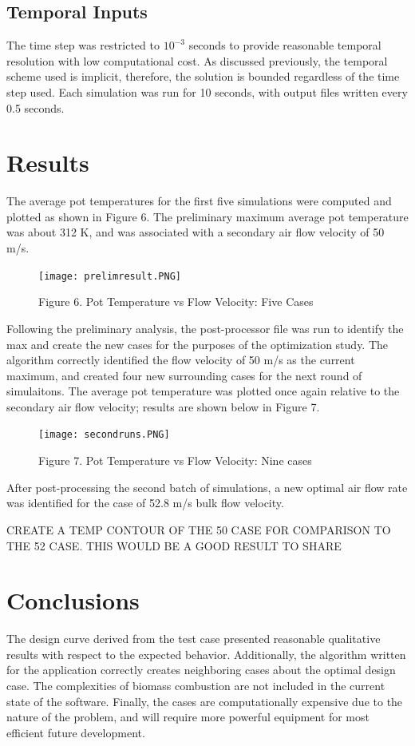 \documentclass[3p,times,twocolumn]{elsarticle}
\begin{document}
\subsection{Temporal Inputs}
The time step was restricted to $10^{-3}$ seconds to provide reasonable temporal resolution with low computational cost. As discussed previously, the temporal scheme used is implicit, therefore, the solution is bounded regardless of the time step used. Each simulation was run for 10 seconds, with output files written every 0.5 seconds.

\section{Results}
The average pot temperatures for the first five simulations were computed and plotted as shown in Figure 6. The preliminary maximum average pot temperature was about 312 K, and was associated with a secondary air flow velocity of 50 m/s.

\begin{figure}{\linewidth}
	\texttt{[image: prelimresult.PNG]}
	\caption{Figure 6. Pot Temperature vs Flow Velocity: Five Cases}
\end{figure}


Following the preliminary analysis, the post-processor file was run to identify the max and create the new cases for the purposes of the optimization study. The algorithm correctly identified the flow velocity of 50 m/s as the current maximum, and created four new surrounding cases for the next round of simulaitons. The average pot temperature was plotted once again relative to the secondary air flow velocity; results are shown below in Figure 7.

\begin{figure}
	\texttt{[image: secondruns.PNG]}
	\caption{Figure 7. Pot Temperature vs Flow Velocity: Nine cases}
\end{figure}


After post-processing the second batch of simulations, a new optimal air flow rate was identified for the case of 52.8 m/s bulk flow velocity.

CREATE A TEMP CONTOUR OF THE 50 CASE FOR COMPARISON TO THE 52 CASE. THIS WOULD BE A GOOD RESULT TO SHARE


\section{Conclusions}
The design curve derived from the test case presented reasonable qualitative results with respect to the expected behavior. Additionally, the algorithm written for the application correctly creates neighboring cases about the optimal design case. The complexities of biomass combustion are not included in the current state of the software. Finally, the cases are computationally expensive due to the nature of the problem, and will require more powerful equipment for most efficient future development.
\end{document}

